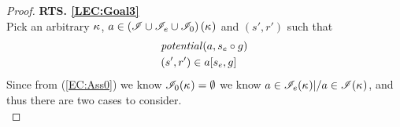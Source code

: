 \begin{lemma}
\begin{proof}

\noindent\textbf{RTS. \ref{LEC:Goal3}}\\
Pick an arbitrary $\kappa_{}$, $a \in \left(\mathscr{I} \cup \mathscr{I}_e \cup \mathscr{I}_0 \right)(\kappa_{})$ and $(s', r')$ such that
%
\begin{align}
	& \mathit{potential}(a, s_e \circ g)  \label{LEC:ass1}\\
	& (s', r') \in a[s_e, g] \label{LEC:ass2}
\end{align}
Since from (\ref{EC:Ass0}) we know $\mathscr{I}_0(\kappa_{}) = \emptyset$ we know $a \in \mathscr{I}_e(\kappa_{}) |/  a \in\mathscr{I}(\kappa_{})$, and thus there are two cases to consider. \\


\end{proof}
\end{lemma}
